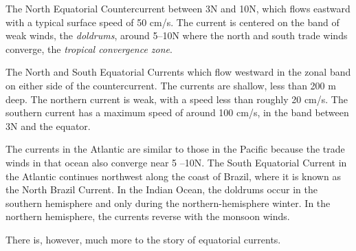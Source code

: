 \begin{enumerate}
\vitem The North Equatorial Countercurrent between 3\degrees N and
10\degrees N, which flows eastward with a typical surface speed of 50
cm/s. The current is centered on the band of weak winds, the
\textit{doldrums}, around 5--10\degrees N where
the north and south trade winds converge, the \textit{tropical
  convergence zone}.

\vitem The North and South Equatorial Currents which flow westward in
the zonal band on either side of the countercurrent. The currents are
shallow, less than 200 m deep. The northern current is weak, with a
speed less than roughly 20 cm/s.  The southern current has a maximum
speed of around 100 cm/s, in the band between 3\degrees N and the
equator.
\end{enumerate}

The currents in the Atlantic are similar to those in the Pacific
because the trade winds in that ocean also converge near 5\degrees
--10\degrees N.  The South Equatorial Current in the Atlantic
continues northwest along the coast of Brazil, where it is known as
the North Brazil Current. In the Indian Ocean, the doldrums occur in
the southern hemisphere and only during the northern-hemisphere
winter. In the northern hemisphere, the currents reverse with the
monsoon winds.

There is, however, much more to the story of equatorial currents.

